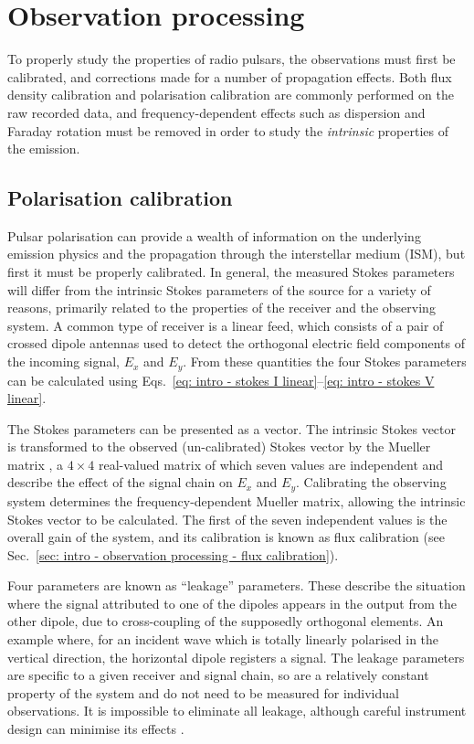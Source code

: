 \section{Observation processing}
\label{sec: intro - observation processing}

To properly study the properties of radio pulsars, the observations must first be calibrated, and corrections made for a number of propagation effects. Both flux density calibration and polarisation calibration are commonly performed on the raw recorded data, and frequency-dependent effects such as dispersion and Faraday rotation must be removed in order to study the \textit{intrinsic} properties of the emission.

\subsection{Polarisation calibration}
\label{sec: intro - observation processing - polarisation calibration}

Pulsar polarisation can provide a wealth of information on the underlying emission physics and the propagation through the interstellar medium (ISM), but first it must be properly calibrated. In general, the measured Stokes parameters will differ from the intrinsic Stokes parameters of the source for a variety of reasons, primarily related to the properties of the receiver and the observing system. A common type of receiver is a linear feed, which consists of a pair of crossed dipole antennas used to detect the orthogonal electric field components of the incoming signal, $E_x$ and $E_y$. From these quantities the four Stokes parameters can be calculated using Eqs.~\eqref{eq: intro - stokes I linear}--\eqref{eq: intro - stokes V linear}.

The Stokes parameters can be presented as a vector. The intrinsic Stokes vector is transformed to the observed (un-calibrated) Stokes vector by the Mueller matrix \citep{Mxxx1948}, a $4\times4$ real-valued matrix of which seven values are independent and describe the effect of the signal chain on $E_x$ and $E_y$. Calibrating the observing system determines the frequency-dependent Mueller matrix, allowing the intrinsic Stokes vector to be calculated. The first of the seven independent values is the overall gain of the system, and its calibration is known as flux calibration (see Sec.~\ref{sec: intro - observation processing - flux calibration}).

Four parameters are known as ``leakage'' parameters. These describe the situation where the signal attributed to one of the dipoles appears in the output from the other dipole, due to cross-coupling of the supposedly orthogonal elements. An example where, for an incident wave which is totally linearly polarised in the vertical direction, the horizontal dipole registers a signal. The leakage parameters are specific to a given receiver and signal chain, so are a relatively constant property of the system and do not need to be measured for individual observations. It is impossible to eliminate all leakage, although careful instrument design can minimise its effects \citep[e.g.][]{RTxx2018}. 

